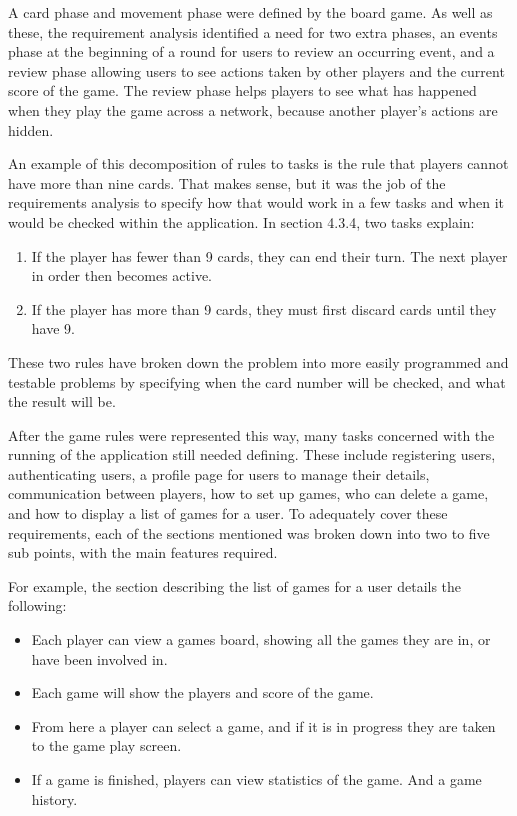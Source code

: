 A card phase and movement phase were defined by the board game. As well as these, the requirement analysis identified a need for two extra phases, an events phase at the beginning of a round for users to review an occurring event, and a review phase allowing users to see actions taken by other players and the current score of the game. The review phase helps players to see what has happened when they play the game across a network, because another player's actions are hidden.
	
An example of this decomposition of rules to tasks is the rule that players cannot have more than nine cards. That makes sense, but it was the job of the requirements analysis to specify how that would work in a few tasks and when it would be checked within the application. In section 4.3.4, two tasks explain: 
	\begin{enumerate}
		\item If the player has fewer than 9 cards, they can end their turn. The next player in order then becomes active. 
		\item If the player has more than 9 cards, they must first discard cards until they have 9. 
	\end{enumerate}
These two rules have broken down the problem into more easily programmed and testable problems by specifying when the card number will be checked, and what the result will be.

After the game rules were represented this way, many tasks concerned with the running of the application still needed defining. These include registering users, authenticating users, a profile page for users to manage their details, communication between players, how to set up games, who can delete a game, and how to display a list of games for a user. To adequately cover these requirements, each of the sections mentioned was broken down into two to five sub points, with the main features required.
	
	For example, the section describing the list of games for a user details the following:
	\begin{itemize}
		\item Each player can view a games board, showing all the games they are in, or have been involved in. 
		\item Each game will show the players and score of the game. 
		\item From here a player can select a game, and if it is in progress they are taken to the game play screen.
		\item If a game is finished, players can view statistics of the game. And a game history.
	\end{itemize}

